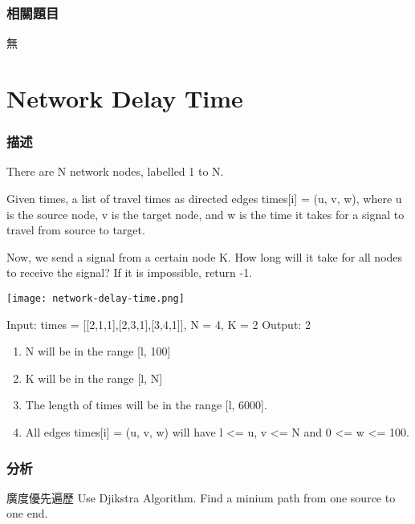 \subsubsection{相關題目}
\begindot
\item 無
\myenddot

\section{Network Delay Time} %
\label{sec:network-delay-time}


\subsubsection{描述}
There are N network nodes, labelled 1 to N.

Given times, a list of travel times as directed edges times[i] = (u, v, w), where u is the source node, v is the target node, and w is the time it takes for a signal to travel from source to target.

Now, we send a signal from a certain node K. How long will it take for all nodes to receive the signal? If it is impossible, return -1.

\begin{center}
\texttt{[image: network-delay-time.png]}\\
\label{fig:network-delay-time}
\end{center}

\begin{Code}
Input: times = [[2,1,1],[2,3,1],[3,4,1]], N = 4, K = 2
Output: 2
\end{Code}

\begin{enumerate}
\item N will be in the range [l, 100]
\item K will be in the range [l, N]
\item The length of times will be in the range [l, 6000].
\item All edges times[i] = (u, v, w) will have l <= u, v <= N and 0 <= w <= 100.
\end{enumerate}
\subsubsection{分析}
廣度優先遍歷
Use Djikstra Algorithm. Find a minium path from one source to one end.


